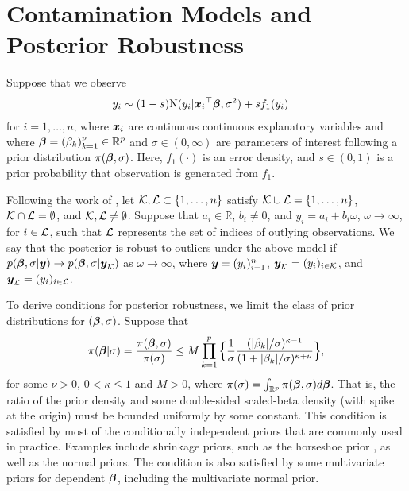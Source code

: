 \documentclass[12pt]{article}
\def\si{{\sigma}}
\def\be{{\beta}}
\def\si{{\sigma}}
\def\om{{\omega}}
\def\non{{\nonumber}}
\def\Lc{{\cal L}}
\def\Kc{{\cal K}}
\def\be{{\beta}}
\def\si{{\sigma}}
\def\om{{\omega}}
\def\ka{{\kappa}}
\def\bbe{{\text{\boldmath $\beta$}}}
\def\x{{\text{\boldmath $x$}}}
\def\y{{\text{\boldmath $y$}}}
\def\Lc{{\cal L}}
\def\Kc{{\cal K}}
\def\non{{\nonumber}}
\begin{document}
\section{ Contamination Models and Posterior Robustness }
\label{sec:model} 
Suppose that we observe 
\begin{align}
&y_i \sim (1 - s) {\rm{N}} ( y_i | {\x _i}^{\top } \bbe , \si ^2 ) + s f_1 ( y_i ) \non 
\end{align}
for $i = 1, \dots , n$, where $\x _i$ are continuous continuous explanatory variables and where $\bbe = ( \be _k )_{k = 1}^{p} \in \mathbb{R} ^p$ and $\si \in (0, \infty )$ are parameters of interest following a prior distribution $\pi ( \bbe , \si )$. 
Here, $f_1 ( \cdot )$ is an error density, and $s \in (0, 1)$ is a prior probability that observation is generated from $f_1$. 

Following the work of \cite{desgagne2015robustness}, %
let $\Kc , \Lc \subset \{ 1, \dots , n \} $ satisfy $\Kc \cup \Lc = \{ 1, \dots , n \} $, $\Kc \cap \Lc = \emptyset $, and $\Kc , \Lc \neq \emptyset $. 
Suppose that $a_i \in \mathbb{R}$, $b_i \neq 0$, and $y_i = a_i + b_i \om $, $\om \to \infty $, for $i \in \Lc $, such that $\Lc $ represents the set of indices of outlying observations. 
We say that the posterior is robust to outliers under the above model if $p( \bbe , \si | \y ) \to p( \bbe , \si | \y _{\Kc } )$ as $\om \to \infty $, where $\y = ( y_i )_{i = 1}^{n}$, $\y _{\Kc } = ( y_i )_{i \in \Kc }$, and $\y _{\Lc } = ( y_i )_{i \in \Lc }$. 

To derive conditions for posterior robustness, we limit the class of prior distributions for $(\bbe,\si)$. 
Suppose that 
\begin{align}
\pi ( \bbe | \si ) = {\pi ( \bbe , \si ) \over \pi ( \si )} \le M \prod_{k = 1}^{p} \Big\{ {1 \over \si } {(| \be _k | / \si )^{\ka - 1} \over (1 + | \be _k | / \si )^{\ka + \nu }} \Big\} ,\label{eq:condition_be} 
\end{align}
for some $\nu > 0$, $0 < \ka \le 1$ and $M > 0$, where $\pi ( \si ) = \int_{\mathbb{R} ^p} \pi ( \bbe , \si ) d\bbe $. 
That is, the ratio of the prior density and some double-sided scaled-beta density (with spike at the origin) must be bounded uniformly by some constant. 
This condition is satisfied by most of the conditionally independent priors that are commonly used in practice. 
Examples include shrinkage priors, such as the horseshoe prior \citep{carvalho2009handling,carvalho2010horseshoe}, as well as the normal priors. 
The condition is also satisfied by some multivariate priors for dependent $\bbe$, including the multivariate normal prior. 
\end{document}
